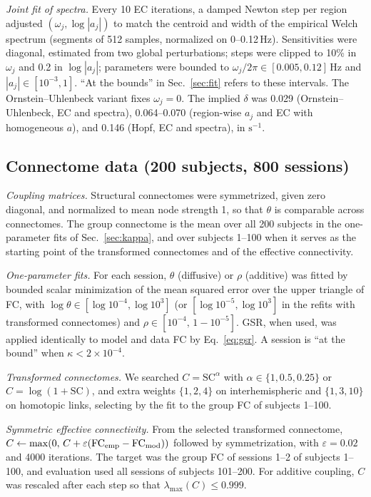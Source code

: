 \documentclass[aip,cha,reprint,amsmath,amssymb]{revtex4-2}
\theoremstyle{remark}
\begin{document}
\emph{Joint fit of spectra.} Every 10 EC iterations, a damped Newton step per region adjusted $(\omega_j,\log|a_j|)$ to match the centroid and width of the empirical Welch spectrum (segments of 512 samples, normalized on 0--0.12\,Hz). Sensitivities were diagonal, estimated from two global perturbations; steps were clipped to 10\% in $\omega_j$ and 0.2 in $\log|a_j|$; parameters were bounded to $\omega_j/2\pi\in[0.005,0.12]$\,Hz and $|a_j|\in[10^{-3},1]$. ``At the bounds'' in Sec.~\ref{sec:fit} refers to these intervals. The Ornstein--Uhlenbeck variant fixes $\omega_j=0$. The implied $\delta$ was 0.029 (Ornstein--Uhlenbeck, EC and spectra), 0.064--0.070 (region-wise $a_j$ and EC with homogeneous $a$), and 0.146 (Hopf, EC and spectra), in $\mathrm{s}^{-1}$.

\subsection{Connectome data (200 subjects, 800 sessions)}

\emph{Coupling matrices.} Structural connectomes were symmetrized, given zero diagonal, and normalized to mean node strength 1, so that $\theta$ is comparable across connectomes. The group connectome is the mean over all 200 subjects in the one-parameter fits of Sec.~\ref{sec:kappa}, and over subjects 1--100 when it serves as the starting point of the transformed connectomes and of the effective connectivity.

\emph{One-parameter fits.} For each session, $\theta$ (diffusive) or $\rho$ (additive) was fitted by bounded scalar minimization of the mean squared error over the upper triangle of FC, with $\log\theta\in[\log10^{-4},\log10^{3}]$ (or $[\log 10^{-5},\log10^3]$ in the refits with transformed connectomes) and $\rho\in[10^{-4},\,1-10^{-5}]$. GSR, when used, was applied identically to model and data FC by Eq.~\eqref{eq:gsr}. A session is ``at the bound'' when $\kappa<2\times10^{-4}$.

\emph{Transformed connectomes.} We searched $C=\mathrm{SC}^{\alpha}$ with $\alpha\in\{1,0.5,0.25\}$ or $C=\log(1+\mathrm{SC})$, and extra weights $\{1,2,4\}$ on interhemispheric and $\{1,3,10\}$ on homotopic links, selecting by the fit to the group FC of subjects 1--100.

\emph{Symmetric effective connectivity.} From the selected transformed connectome, $C\leftarrow\max(0,\,C+\varepsilon(\mathrm{FC}_{\rm emp}-\mathrm{FC}_{\rm mod}))$ followed by symmetrization, with $\varepsilon=0.02$ and 4000 iterations. The target was the group FC of sessions 1--2 of subjects 1--100, and evaluation used all sessions of subjects 101--200. For additive coupling, $C$ was rescaled after each step so that $\lambda_{\max}(C)\le0.999$.
\end{document}

